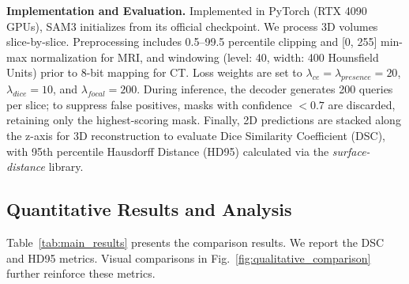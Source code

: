 \documentclass[runningheads]{llncs}
\begin{document}
\noindent\textbf{Implementation and Evaluation.} Implemented in PyTorch (RTX 4090 GPUs), SAM3 initializes from its official checkpoint. We process 3D volumes slice-by-slice. Preprocessing includes 0.5--99.5 percentile clipping and [0, 255] min-max normalization for MRI, and windowing (level: 40, width: 400 Hounsfield Units) prior to 8-bit mapping for CT. Loss weights are set to $\lambda_{ce}\!=\!\lambda_{presence}\!=\!20$, $\lambda_{dice}\!=\!10$, and $\lambda_{focal}\!=\!200$. During inference, the decoder generates 200 queries per slice; to suppress false positives, masks with confidence $<0.7$ are discarded, retaining only the highest-scoring mask. Finally, 2D predictions are stacked along the z-axis for 3D reconstruction to evaluate Dice Similarity Coefficient (DSC), with 95th percentile Hausdorff Distance (HD95) calculated via the \textit{surface-distance} library.

\subsection{Quantitative Results and Analysis}
Table~\ref{tab:main_results} presents the comparison results. We report the DSC and HD95 metrics. Visual comparisons in Fig.~\ref{fig:qualitative_comparison} further reinforce these metrics.
\end{document}
